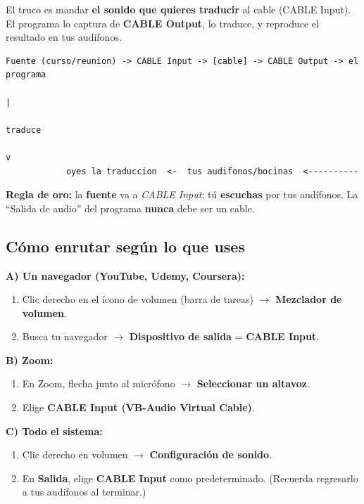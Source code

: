 \documentclass[11pt,a4paper]{article}
\begin{document}
El truco es mandar \textbf{el sonido que quieres traducir} al cable
(CABLE Input). El programa lo captura de \textbf{CABLE Output}, lo traduce, y
reproduce el resultado en tus audífonos.

\begin{lstlisting}
Fuente (curso/reunion) -> CABLE Input -> [cable] -> CABLE Output -> el programa
                                                                       |
                                                                    traduce
                                                                       v
            oyes la traduccion  <-  tus audifonos/bocinas  <----------
\end{lstlisting}

\noindent\textbf{Regla de oro:} la \textbf{fuente} va a \textit{CABLE Input};
tú \textbf{escuchas} por tus audífonos. La ``Salida de audio'' del programa
\textbf{nunca} debe ser un cable.

\subsection{Cómo enrutar según lo que uses}
\textbf{A) Un navegador (YouTube, Udemy, Coursera):}
\begin{enumerate}[leftmargin=*,nosep]
  \item Clic derecho en el ícono de volumen (barra de tareas) $\rightarrow$ \textbf{Mezclador de volumen}.
  \item Busca tu navegador $\rightarrow$ \textbf{Dispositivo de salida} = \textbf{CABLE Input}.
\end{enumerate}

\textbf{B) Zoom:}
\begin{enumerate}[leftmargin=*,nosep]
  \item En Zoom, flecha junto al micrófono $\rightarrow$ \textbf{Seleccionar un altavoz}.
  \item Elige \textbf{CABLE Input (VB-Audio Virtual Cable)}.
\end{enumerate}

\textbf{C) Todo el sistema:}
\begin{enumerate}[leftmargin=*,nosep]
  \item Clic derecho en volumen $\rightarrow$ \textbf{Configuración de sonido}.
  \item En \textbf{Salida}, elige \textbf{CABLE Input} como predeterminado.
  (Recuerda regresarlo a tus audífonos al terminar.)
\end{enumerate}
\end{document}
